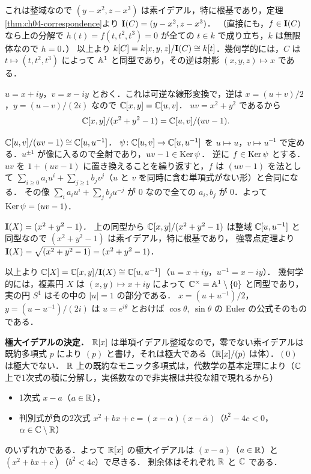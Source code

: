 これは整域なので $(y-x^2,z-x^3)$ は素イデアル，特に根基であり，定理\ref{thm:ch04-correspondence}より $\mathbf{I}(C)=(y-x^2,z-x^3)$．
（直接にも，$f\in\mathbf{I}(C)$ なら上の分解で $h(t)=f(t,t^2,t^3)=0$ が全ての $t\in k$ で成り立ち，$k$ は無限体なので $h=0$．）
以上より $k[C]=k[x,y,z]/\mathbf{I}(C)\cong k[t]$．幾何学的には，$C$ は $t\mapsto(t,t^2,t^3)$ によって $\mathbb{A}^1$ と同型であり，その逆は射影 $(x,y,z)\mapsto x$ である．

$u=x+iy$，$v=x-iy$ とおく．これは可逆な線形変換で，逆は $x=(u+v)/2$，$y=(u-v)/(2i)$ なので $\mathbb{C}[x,y]=\mathbb{C}[u,v]$．
$uv=x^2+y^2$ であるから
\[
  \mathbb{C}[x,y]/(x^2+y^2-1)=\mathbb{C}[u,v]/(uv-1).
\]

\emph{$\mathbb{C}[u,v]/(uv-1)\cong\mathbb{C}[u,u^{-1}]$．}
$\psi\colon\mathbb{C}[u,v]\to\mathbb{C}[u,u^{-1}]$ を $u\mapsto u$，$v\mapsto u^{-1}$ で定める．$u^{\pm1}$ が像に入るので全射であり，$uv-1\in\operatorname{Ker}\psi$．
逆に $f\in\operatorname{Ker}\psi$ とする．$uv$ を $1+(uv-1)$ に置き換えることを繰り返すと，$f$ は $(uv-1)$ を法として
$\sum_{i\ge0}a_iu^i+\sum_{j\ge1}b_jv^j$（$u$ と $v$ を同時に含む単項式がない形）と合同になる．
その像 $\sum_ia_iu^i+\sum_jb_ju^{-j}$ が $0$ なので全ての $a_i,b_j$ が $0$．よって $\operatorname{Ker}\psi=(uv-1)$．

\emph{$\mathbf{I}(X)=(x^2+y^2-1)$．}
上の同型から $\mathbb{C}[x,y]/(x^2+y^2-1)$ は整域 $\mathbb{C}[u,u^{-1}]$ と同型なので $(x^2+y^2-1)$ は素イデアル，特に根基であり，
強零点定理より $\mathbf{I}(X)=\sqrt{(x^2+y^2-1)}=(x^2+y^2-1)$．

以上より $\mathbb{C}[X]=\mathbb{C}[x,y]/\mathbf{I}(X)\cong\mathbb{C}[u,u^{-1}]$（$u=x+iy$，$u^{-1}=x-iy$）．
幾何学的には，複素円 $X$ は $(x,y)\mapsto x+iy$ によって $\mathbb{C}^\times=\mathbb{A}^1\setminus\{0\}$ と同型であり，実の円 $S^1$ はその中の $|u|=1$ の部分である．
$x=(u+u^{-1})/2$，$y=(u-u^{-1})/(2i)$ は $u=e^{i\theta}$ とおけば $\cos\theta,\ \sin\theta$ の Euler の公式そのものである．

\textbf{極大イデアルの決定．}
$\mathbb{R}[x]$ は単項イデアル整域なので，零でない素イデアルは既約多項式 $p$ により $(p)$ と書け，それは極大である（$\mathbb{R}[x]/(p)$ は体）．$(0)$ は極大でない．
$\mathbb{R}$ 上の既約なモニック多項式は，代数学の基本定理により（$\mathbb{C}$ 上で1次式の積に分解し，実係数なので非実根は共役な組で現れるから）
\begin{itemize}
  \item 1次式 $x-a$（$a\in\mathbb{R}$），
  \item 判別式が負の2次式 $x^2+bx+c=(x-\alpha)(x-\bar\alpha)$（$b^2-4c<0$，$\alpha\in\mathbb{C}\setminus\mathbb{R}$）
\end{itemize}
のいずれかである．よって $\mathbb{R}[x]$ の極大イデアルは $(x-a)$（$a\in\mathbb{R}$）と $(x^2+bx+c)$（$b^2<4c$）で尽きる．
剰余体はそれぞれ $\mathbb{R}$ と $\mathbb{C}$ である．

